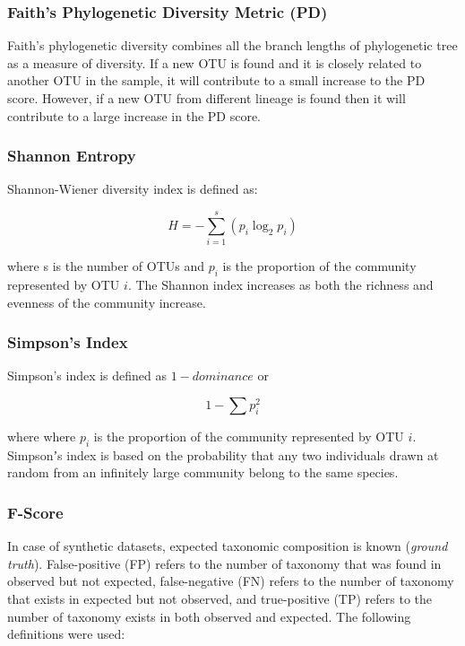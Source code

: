 \documentclass[letterpaper,twocolumn]{article}
\begin{document}
\subsubsection{Faith’s Phylogenetic Diversity Metric (PD)}
Faith’s phylogenetic diversity\cite{MARfaith1992conservation} combines all 
the branch lengths of phylogenetic tree as a measure of diversity. If a new 
OTU is found and it is closely related to another OTU in the sample, it will contribute to 
a small increase to the PD score. However, if a new OTU from different lineage is found then it will contribute to a large increase in the PD score.

\subsubsection{Shannon Entropy}
Shannon-Wiener diversity index is defined as:

\begin{equation}
H={-} \sum_{i=1}^{s} \left( p_i\log_2p_i \right)
\end{equation}

where s is the number of OTUs and $p_i$ is the proportion of the community represented by OTU $i$. The Shannon index increases as both the richness and evenness of the community increase.

\subsubsection{Simpson's Index}
Simpson’s index is defined as ${1-dominance}$ or

\begin{equation}
1 - \sum p_i^2
\end{equation}

where where $p_i$ is the proportion of the community represented by OTU $i$. Simpsonʼs index is based on the probability that any two individuals drawn at random from an infinitely large community belong to the same species.


\subsubsection{F-Score}
In case of synthetic datasets, expected taxonomic composition is known (\emph{ground truth}). False-positive (FP) 
refers to the number of taxonomy that was found in 
observed but not expected, false-negative (FN) refers to the number of taxonomy that exists in expected but not observed, and true-positive (TP) refers to the number of taxonomy exists in both observed and expected. The following definitions were used:
\end{document}

